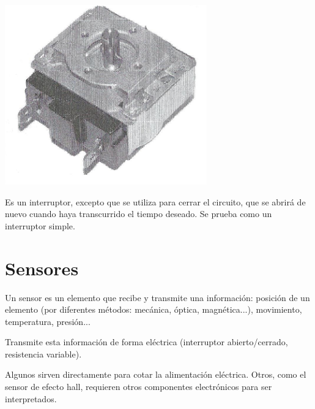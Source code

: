 \documentclass[a5paper,twoside,openany]{book}
\begin{document}
\noindent\begin{minipage}[t]{0.5\textwidth}\vspace{0pt}
\includegraphics[width=\linewidth]{temporizador}
\end{minipage}
\hfill%
\begin{minipage}[t]{0.4\textwidth}\vspace{\fill}
\vspace{\fill} %
Es un interruptor, excepto que se utiliza para cerrar el circuito,
que se abrirá de nuevo cuando haya transcurrido el tiempo deseado.
Se prueba como un interruptor simple.
\vspace{\fill} %
\end{minipage}
\vspace{1em}

\section{Sensores}

Un sensor es un elemento que recibe y transmite una información: posición de un elemento (por diferentes métodos: mecánica, óptica, magnética...), movimiento, temperatura, presión...

Transmite esta información de forma eléctrica (interruptor abierto/cerrado, resistencia variable).

Algunos sirven directamente para cotar la alimentación eléctrica.
Otros, como el sensor de efecto hall, requieren otros componentes electrónicos para ser interpretados.\\
\end{document}
